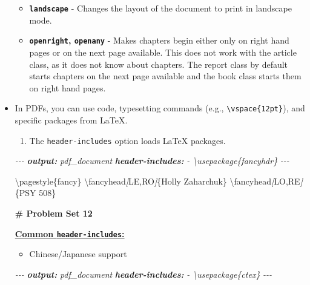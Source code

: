 \documentclass[
  a4paper,
  twoside,
  openright]{book}
\newenvironment{Shaded}{\begin{snugshade}}{\end{snugshade}}
\newcommand{\AnnotationTok}[1]{\textcolor[rgb]{0.56,0.35,0.01}{\textbf{\textit{#1}}}}
\newcommand{\CommentTok}[1]{\textcolor[rgb]{0.56,0.35,0.01}{\textit{#1}}}
\newcommand{\FunctionTok}[1]{\textcolor[rgb]{0.13,0.29,0.53}{\textbf{#1}}}
\newcommand{\NormalTok}[1]{#1}
\newcommand{\OtherTok}[1]{\textcolor[rgb]{0.56,0.35,0.01}{#1}}
\providecommand{\tightlist}{%
  \setlength{\itemsep}{0pt}\setlength{\parskip}{0pt}}
\theoremstyle{definition}
\theoremstyle{definition}
\theoremstyle{definition}
\theoremstyle{definition}
\theoremstyle{remark}
\begin{document}
\begin{itemize}
\begin{itemize}
  \item
    \textbf{\texttt{landscape}} - Changes the layout of the document to print in landscape mode.
  \item
    \textbf{\texttt{openright}, \texttt{openany}} - Makes chapters begin either only on right hand pages or on the next page available. This does not work with the article class, as it does not know about chapters. The report class by default starts chapters on the next page available and the book class starts them on right hand pages.
  \end{itemize}
\item
  In PDFs, you can use code, typesetting commands (e.g., \texttt{\textbackslash{}vspace\{12pt\}}), and specific packages from LaTeX.

  \begin{enumerate}
  \def\labelenumi{\arabic{enumi}.}
  \tightlist
  \item
    The \texttt{header-includes} option loads LaTeX packages.
  \end{enumerate}

\begin{Shaded}
\begin{Highlighting}[]
\CommentTok{{-}{-}{-}}
\AnnotationTok{output:}\CommentTok{ pdf\_document}
\AnnotationTok{header{-}includes:}
\CommentTok{  {-} \textbackslash{}usepackage\{fancyhdr\}}
\CommentTok{{-}{-}{-}}

\NormalTok{\textbackslash{}pagestyle\{fancy\}}
\NormalTok{\textbackslash{}fancyhead}\CommentTok{[}\OtherTok{LE,RO}\CommentTok{]}\NormalTok{\{Holly Zaharchuk\}}
\NormalTok{\textbackslash{}fancyhead}\CommentTok{[}\OtherTok{LO,RE}\CommentTok{]}\NormalTok{\{PSY 508\}}

\FunctionTok{\# Problem Set 12}
\end{Highlighting}
\end{Shaded}

  \href{https://github.com/hao203/rmarkdown-YAML?tab=readme-ov-file\#header-includes}{\textbf{Common \texttt{header-includes}:}}

  \begin{itemize}
  \tightlist
  \item
    Chinese/Japanese support
  \end{itemize}

\begin{Shaded}
\begin{Highlighting}[]
\CommentTok{{-}{-}{-}}
\AnnotationTok{output:}\CommentTok{ pdf\_document}
\AnnotationTok{header{-}includes:}
\CommentTok{  {-} \textbackslash{}usepackage\{ctex\}}
\CommentTok{{-}{-}{-}}
\end{Highlighting}
\end{Shaded}


\end{itemize}
\end{document}
